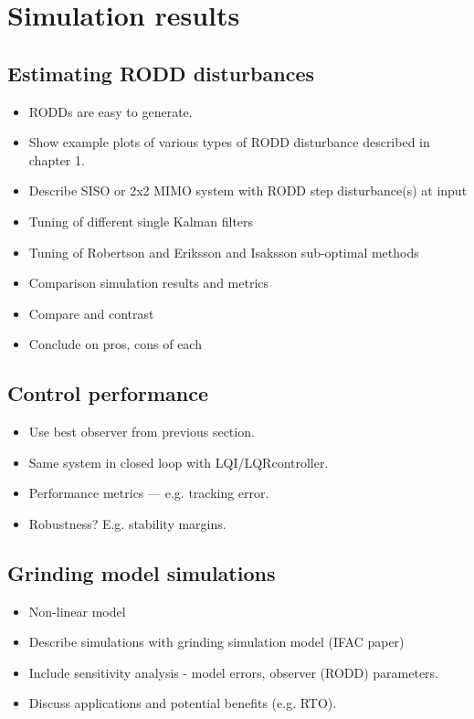 \chapter{Simulation results}
\label{chap-simulation}

\section{Estimating RODD disturbances}

\begin{itemize}
	\item RODDs are easy to generate.
	\item Show example plots of various types of RODD disturbance described in chapter 1.
	\item Describe SISO or 2x2 MIMO system with RODD step disturbance(s) at input
	\item Tuning of different single Kalman filters
	\item Tuning of Robertson and Eriksson and Isaksson sub-optimal methods
	\item Comparison simulation results and metrics
	\item Compare and contrast
	\item Conclude on pros, cons of each
\end{itemize}

\section{Control performance}

\begin{itemize}
	\item Use best observer from previous section.
	\item Same system in closed loop with LQI/LQRcontroller.
	\item Performance metrics — e.g. tracking error.
	\item Robustness?  E.g. stability margins.
\end{itemize}


\section{Grinding model simulations}

\begin{itemize}
	\item Non-linear model
	\item Describe simulations with grinding simulation model (IFAC paper)
	\item Include sensitivity analysis - model errors, observer (RODD) parameters.
	\item Discuss applications and potential benefits (e.g. RTO).
\end{itemize}

